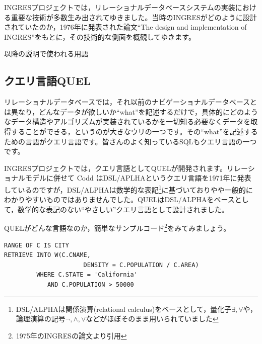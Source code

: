 INGRESプロジェクトでは，リレーショナルデータベースシステムの実装における重要な技術が多数生み出されてゆきました。当時のINGRESがどのように設計されていたのか，1976年に発表された論文``The design and implementation of INGRES''をもとに，その技術的な側面を概観してゆきます。


\begin{center}
 \begin{minipage}{0.95\textwidth}
  \begin{screen}
   以降の説明で使われる用語


   \footnotesize




  \end{screen}
 \end{minipage}
 \vspace*{0.6\Cvs}
\end{center}


\subsection{クエリ言語QUEL}


リレーショナルデータベースでは，それ以前のナビゲーショナルデータベースとは異なり，どんなデータが欲しいか``what''を記述するだけで，具体的にどのようなデータ構造やアルゴリズムが実装されているかを一切知る必要なくデータを取得することができる，というのが大きなウリの一つです。その``what''を記述するための言語がクエリ言語です。皆さんのよく知っているSQLもクエリ言語の一つです。


INGRESプロジェクトでは，クエリ言語としてQUELが開発されます。リレーショナルモデルに併せて Codd はDSL/APLHAというクエリ言語を1971年に発表しているのですが，DSL/ALPHAは数学的な表記\footnote{DSL/ALPHAは関係演算(relational calculus)をベースとして，量化子$\exists, \forall$や，論理演算の記号$\lnot,\land,\lor$などがほぼそのまま用いられていました}に基づいておりやや一般的にわかりやすいものではありませんでした。QUELはDSL/ALPHAをベースとして，数学的な表記のない``やさしい''クエリ言語として設計されました。


QUELがどんな言語なのか，簡単なサンプルコード\footnote{1975年のINGRESの論文より引用}をみてみましょう。

\begin{center}
 \begin{minipage}{0.8\textwidth}
  \begin{lstlisting}
RANGE OF C IS CITY
RETRIEVE INTO W(C.CNAME,
                      DENSITY = C.POPULATION / C.AREA)
         WHERE C.STATE = 'California'
            AND C.POPULATION > 50000
  \end{lstlisting}
 \end{minipage}
\end{center}

